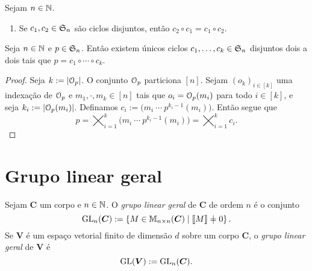 \begin{proposition}
	Sejam $n \in \mathbb{N}$.
	\begin{enumerate}
	\item Se $c_1,c_2 \in \mathfrak{S}_n$ são ciclos disjuntos, então $c_2 \circ c_1 = c_1 \circ c_2$.
	\end{enumerate}
\end{proposition}

\begin{proposition}
	Seja $n \in \mathbb{N}$ e $p \in \mathfrak{S}_n$. Então existem únicos ciclos $c_1,\ldots,c_k \in \mathfrak{S}_n$ disjuntos dois a dois tais que $p=c_1 \circ \cdots \circ c_k$.
\end{proposition}
\begin{proof}
	Seja $k := \left\lvert{\mathcal{O}_p}\right\rvert$. O conjunto $\mathcal{O}_p$ particiona $[n]$. Sejam $(o_k)_{i \in [k]}$ uma indexação de $\mathcal{O}_p$ e $m_1,\cdot,m_k \in [n]$ tais que $o_i=\mathcal{O}_p(m_i)$ para todo $i \in [k]$, e seja $k_i := \left\lvert{\mathcal{O}_p(m_i)}\right\rvert$. Definamos $c_i :=  \bigl( m_i \ \cdots \  p^{k_i-1}(m_i)\bigr)$. Então segue que
	\begin{equation*}
	p = \bigtimes_{i=1}^k \bigl( m_i \ \cdots \  p^{k_i-1}(m_i)\bigr) = \bigtimes_{i=1}^k c_i.
	\end{equation*}
\end{proof}












\section{Grupo linear geral}

\begin{definition}
Sejam $\bm C$ um corpo e $n \in \mathbb{N}$. O \emph{grupo linear geral} de $\bm C$ de ordem $n$ é o conjunto
	\begin{equation*}
	\GL_n(\bm C) := \set{M \in \M_{n\times n}(\bm C)}{\det M \neq 0}.
	\end{equation*}
Se $\bm V$ é um espaço vetorial finito de dimensão $d$ sobre um corpo $\bm C$, o \emph{grupo linear geral} de $\bm V$ é
	\begin{equation*}
	\operatorname{GL}(\bm V) := \operatorname{GL}_n(\bm C).
	\end{equation*}
\end{definition}

